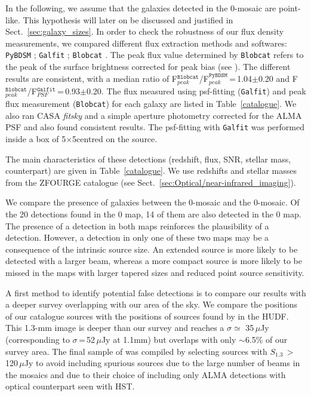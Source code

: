 \documentclass[longauth]{aa}
\begin{document}
In the following, we assume that the galaxies detected in the 0-mosaic are point-like. This hypothesis will later on be discussed and justified in Sect.~\ref{sec:galaxy_sizes}. In order to check the robustness of our flux density measurements, we compared different flux extraction methods and softwares: \texttt{PyBDSM} \mbox{\citep{Mohan2015}}; \texttt{Galfit} \citep{Peng2010}; \texttt{Blobcat} \citep{Hales2012}. The peak flux value determined by \texttt{Blobcat} refers to the peak of the surface brightness corrected for peak bias (see \citealt{Hales2012}). The different results are consistent, with a median ratio of F$_{peak}^{\texttt{Blobcat}}$/F$_{peak}^{\texttt{PyBDSM}}$\,=\,1.04$\pm$0.20 and F$_{peak}^{\texttt{Blobcat}}$/F$_{PSF}^{\texttt{Galfit}}$\,=\,0.93$\pm$0.20. The flux measured using psf-fitting (\texttt{Galfit}) and peak flux measurement (\texttt{Blobcat}) for each galaxy are listed in Table~\ref{catalogue}. We also ran CASA \textit{fitsky} and a simple aperture photometry corrected for the ALMA PSF and also found consistent results. The psf-fitting with \texttt{Galfit} was performed inside a box of 5$\times$5\arcsec centred on the source.

The main characteristics of these detections (redshift, flux, SNR, stellar mass, counterpart) are given in Table~\ref{catalogue}. We use redshifts and stellar masses from the ZFOURGE catalogue (see Sect.~\ref{sec:Optical/near-infrared_imaging}).

We compare the presence of galaxies between the 0-mosaic and the 0-mosaic. Of the 20 detections found in the 0 map, 14 of them are also detected in the 0 map. The presence of a detection in both maps reinforces the plausibility of a detection. However, a detection in only one of these two maps may be a consequence of the intrinsic source size. An extended source is more likely to be detected with a larger beam, whereas a more compact source is more likely to be missed in the maps with larger tapered sizes and reduced point source sensitivity. 



A first method to identify potential false detections is to compare our results with a deeper survey overlapping with our area of the sky. We compare the positions of our catalogue sources with the positions of sources found by \cite{Dunlop2017} in the HUDF. This 1.3-mm image is deeper than our survey and reaches a $\sigma \simeq$ 35\,$\mu$Jy (corresponding to $\sigma$\,=\,52\,$\mu$Jy at 1.1mm) but overlaps with only $\sim$6.5\% of our survey area. The final sample of \cite{Dunlop2017} was compiled by selecting sources with $S_{1.3}\,>\,$ 120\,$\mu$Jy to avoid including spurious sources due to the large number of beams in the mosaics and due to their choice of including only ALMA detections with optical counterpart seen with HST.
\end{document}
